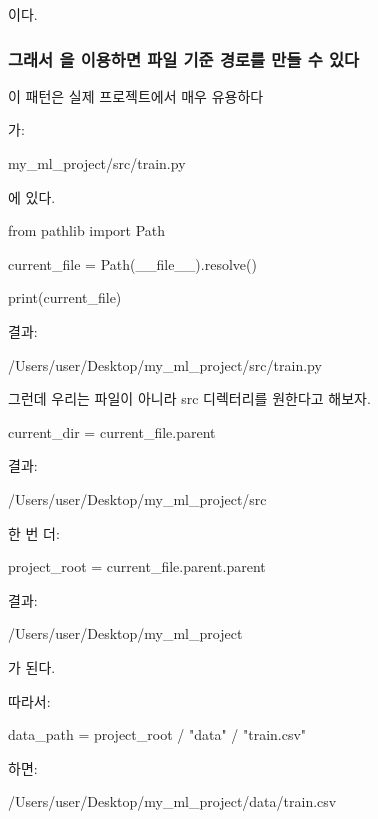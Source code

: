 이다.

\subsubsection{그래서 을 이용하면 파일 기준 경로를 만들 수 있다}

이 패턴은 실제 프로젝트에서 매우 유용하다

가:

\begin{dhkzsh}
my_ml_project/src/train.py
\end{dhkzsh}

에 있다.

\begin{dhkcode}
from pathlib import Path

current_file = Path(__file__).resolve()

print(current_file)
\end{dhkcode}

결과:

\begin{dhkzsh}
/Users/user/Desktop/my_ml_project/src/train.py
\end{dhkzsh}

그런데 우리는 파일이 아니라 src 디렉터리를 원한다고 해보자.

\begin{dhkcode}
current_dir = current_file.parent
\end{dhkcode}

결과:

\begin{dhkzsh}
/Users/user/Desktop/my_ml_project/src
\end{dhkzsh}

한 번 더:

\begin{dhkcode}
project_root = current_file.parent.parent
\end{dhkcode}

결과:

\begin{dhkzsh}
/Users/user/Desktop/my_ml_project
\end{dhkzsh}

가 된다.

따라서:

\begin{dhkcode}
data_path = project_root / "data" / "train.csv"
\end{dhkcode}

하면:

\begin{dhkzsh}
/Users/user/Desktop/my_ml_project/data/train.csv
\end{dhkzsh}

